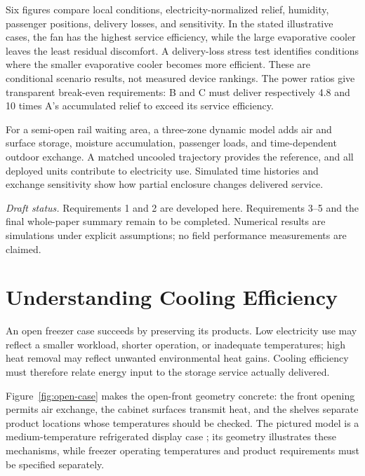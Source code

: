 \documentclass[12pt]{article}
\begin{document}
Six figures compare local conditions, electricity-normalized relief, humidity, passenger positions, delivery losses, and sensitivity. In the stated illustrative cases, the fan has the highest service efficiency, while the large evaporative cooler leaves the least residual discomfort. A delivery-loss stress test identifies conditions where the smaller evaporative cooler becomes more efficient. These are conditional scenario results, not measured device rankings. The power ratios give transparent break-even requirements: B and C must deliver respectively 4.8 and 10 times A's accumulated relief to exceed its service efficiency.

For a semi-open rail waiting area, a three-zone dynamic model adds air and surface storage, moisture accumulation, passenger loads, and time-dependent outdoor exchange. A matched uncooled trajectory provides the reference, and all deployed units contribute to electricity use. Simulated time histories and exchange sensitivity show how partial enclosure changes delivered service.

\medskip
\noindent\textit{Draft status.} Requirements 1 and 2 are developed here. Requirements 3--5 and the final whole-paper summary remain to be completed. Numerical results are simulations under explicit assumptions; no field performance measurements are claimed.

\clearpage
\pagestyle{fancy}
\tableofcontents
\clearpage

\section{Understanding Cooling Efficiency}
\label{sec:understand}

An open freezer case succeeds by preserving its products. Low electricity use may reflect a smaller workload, shorter operation, or inadequate temperatures; high heat removal may reflect unwanted environmental heat gains. Cooling efficiency must therefore relate energy input to the storage service actually delivered.


Figure~\ref{fig:open-case} makes the open-front geometry concrete: the front opening permits air exchange, the cabinet surfaces transmit heat, and the shelves separate product locations whose temperatures should be checked. The pictured model is a medium-temperature refrigerated display case \cite{hillphoenix}; its geometry illustrates these mechanisms, while freezer operating temperatures and product requirements must be specified separately.
\end{document}
